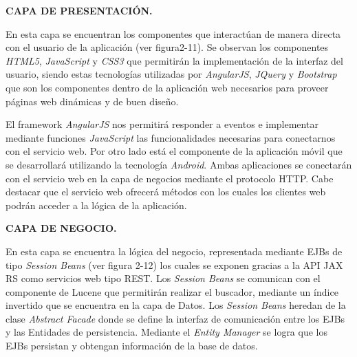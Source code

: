 \documentclass{memoria}
\begin{document}
\textbf{CAPA DE PRESENTACIÓN.}

En esta capa se encuentran los componentes que interactúan de manera directa con el usuario de la aplicación (ver figura2-11). Se observan los componentes \textsl{HTML5}, \textsl{JavaScript} y \textsl{CSS3} que permitirán la implementación de la interfaz del usuario, siendo estas tecnologías utilizadas por \textsl{AngularJS}, \textsl{JQuery} y \textsl{Bootstrap} que son los componentes dentro de la aplicación web necesarios para proveer páginas web dinámicas y de buen diseño. 

El framework \textsl{AngularJS} nos permitirá responder a eventos e implementar mediante funciones \textsl{JavaScript} las funcionalidades necesarias para conectarnos con el servicio web. Por otro lado está el componente de la aplicación móvil que se desarrollará utilizando la tecnología \textsl{Android}.  Ambas aplicaciones se conectarán con el servicio web en la capa de negocios mediante el protocolo HTTP. Cabe destacar que el servicio web ofrecerá métodos con los cuales los clientes web podrán acceder a la lógica de la aplicación.


\textbf{CAPA DE NEGOCIO.}

En esta capa se encuentra la lógica del negocio, representada mediante EJBs de tipo \textsl{Session Beans} (ver figura 2-12) los cuales se exponen gracias a la API JAX RS como servicios web tipo REST.  Los \textsl{Session Beans} se comunican con el componente de Lucene que permitirán realizar el buscador, mediante un índice invertido que se encuentra en la capa de Datos. Los \textsl{Session Beans} heredan de la clase \textsl{Abstract Facade} donde se define la interfaz de comunicación entre los EJBs y las Entidades de persistencia. Mediante el \textsl{Entity Manager} se logra que los EJBs persistan y obtengan información de la base de datos. \\
\end{document}
